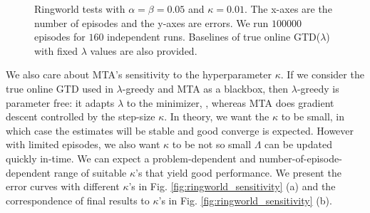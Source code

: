 \documentclass{article}
\begin{document}
\begin{figure}
\begin{adjustwidth}{-0.8in}{-0.8in}
\hfill
{}
\hfill
{}

\caption{\small Ringworld tests with $\alpha = \beta = 0.05$ and $\kappa = 0.01$. The x-axes are the number of episodes and the y-axes are errors. We run $100000$ episodes for $160$ independent runs. Baselines of true online GTD($\lambda$) with fixed $\lambda$ values are also provided.}
\label{fig:ringworld_off}
\end{adjustwidth}
\end{figure}
We also care about MTA's sensitivity to the hyperparameter $\kappa$. If we consider the true online GTD used in $\lambda$-greedy and MTA as a blackbox, then $\lambda$-greedy is parameter free: it adapts $\lambda$ to the minimizer, , whereas MTA does gradient descent controlled by the step-size $\kappa$. In theory, we want the $\kappa$ to be small, in which case the estimates will be stable and good converge is expected. However with limited episodes, we also want $\kappa$ to be not so small \st{} $\Lambda$ can be updated quickly in-time. We can expect a problem-dependent and number-of-episode-dependent range of suitable $\kappa$'s that yield good performance. We present the error curves with different $\kappa$'s in Fig. \ref{fig:ringworld_sensitivity} (a) and the correspondence of final results to $\kappa$'s in Fig. \ref{fig:ringworld_sensitivity} (b).
\end{document}
